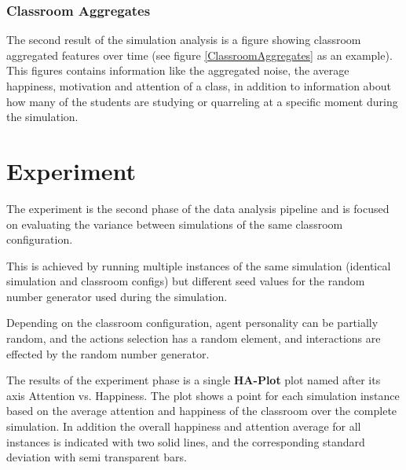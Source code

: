 \subsubsection{Classroom Aggregates}
The second result of the simulation analysis is a figure showing classroom
aggregated features over time (see figure \ref{ClassroomAggregates} as an example).
This figures contains information like the aggregated noise, the average happiness,
motivation and attention of a class, in addition to information about how many of
the students are studying or quarreling at a specific moment during the simulation.

\begin{figure}[H]
\end{figure}



\section{Experiment}
The experiment is the second phase of the data analysis pipeline and is focused
on evaluating the variance between simulations of the same classroom configuration.

\begin{figure}[H]
\end{figure}


This is achieved by running multiple instances of the same simulation (identical simulation 
and classroom configs) but different seed values for the random number generator used
during the simulation.

Depending on the classroom configuration, agent personality can be partially random,
and the actions selection has a random element, and interactions are effected by
the random number generator.

The results of the experiment phase is a single \textbf{HA-Plot} plot named after
its axis Attention vs. Happiness. The plot shows a point for each simulation instance based on
the average attention and happiness of the classroom over the complete simulation.
In addition the overall happiness and attention average for all instances is
indicated with two solid lines, and the corresponding standard deviation with
semi transparent bars.

